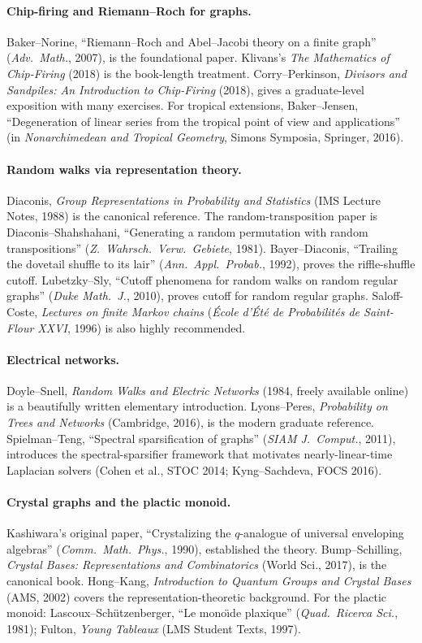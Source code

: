 \paragraph{Chip-firing and Riemann--Roch for graphs.} Baker--Norine,
``Riemann--Roch and Abel--Jacobi theory on a finite graph''
(\emph{Adv.\ Math.}, 2007), is the foundational paper. Klivans's
\emph{The Mathematics of Chip-Firing} (2018) is the book-length
treatment. Corry--Perkinson, \emph{Divisors and Sandpiles: An
Introduction to Chip-Firing} (2018), gives a graduate-level
exposition with many exercises. For tropical extensions,
Baker--Jensen, ``Degeneration of linear series from the tropical
point of view and applications'' (in \emph{Nonarchimedean and Tropical
Geometry}, Simons Symposia, Springer, 2016).

\paragraph{Random walks via representation theory.} Diaconis,
\emph{Group Representations in Probability and Statistics}
(IMS Lecture Notes, 1988) is the canonical reference. The
random-transposition paper is Diaconis--Shahshahani, ``Generating a
random permutation with random transpositions''
(\emph{Z.\ Wahrsch.\ Verw.\ Gebiete}, 1981). Bayer--Diaconis,
``Trailing the dovetail shuffle to its lair''
(\emph{Ann.\ Appl.\ Probab.}, 1992), proves the riffle-shuffle cutoff.
Lubetzky--Sly, ``Cutoff phenomena for random walks on random regular
graphs'' (\emph{Duke Math.\ J.}, 2010), proves cutoff for random
regular graphs. Saloff-Coste, \emph{Lectures on finite Markov chains}
(\emph{\'Ecole d'\'Et\'e de Probabilit\'es de Saint-Flour XXVI},
1996) is also highly recommended.

\paragraph{Electrical networks.} Doyle--Snell,
\emph{Random Walks and Electric Networks} (1984, freely available
online) is a beautifully written elementary introduction. Lyons--Peres,
\emph{Probability on Trees and Networks} (Cambridge, 2016), is the
modern graduate reference. Spielman--Teng,
``Spectral sparsification of graphs'' (\emph{SIAM J.\ Comput.}, 2011),
introduces the spectral-sparsifier framework that motivates
nearly-linear-time Laplacian solvers (Cohen et al., STOC 2014;
Kyng--Sachdeva, FOCS 2016).

\paragraph{Crystal graphs and the plactic monoid.} Kashiwara's
original paper, ``Crystalizing the $q$-analogue of universal
enveloping algebras'' (\emph{Comm.\ Math.\ Phys.}, 1990), established
the theory. Bump--Schilling, \emph{Crystal Bases: Representations
and Combinatorics} (World Sci., 2017), is the canonical book.
Hong--Kang, \emph{Introduction to Quantum Groups and Crystal Bases}
(AMS, 2002) covers the representation-theoretic background. For the
plactic monoid: Lascoux--Sch\"utzenberger, ``Le mono\"\i de plaxique''
(\emph{Quad.\ Ricerca Sci.}, 1981); Fulton, \emph{Young Tableaux}
(LMS Student Texts, 1997).

